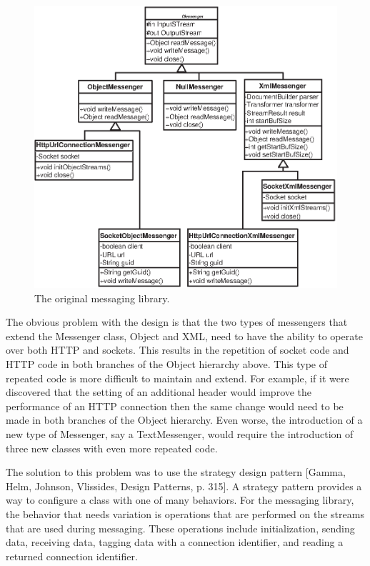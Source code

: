 \documentclass{article}
\begin{document}
\begin{figure}[!hbp]
\includegraphics{old.eps}
\caption{The original messaging library.} \label{old}
\end{figure}

The obvious problem with the design is that the two types of
messengers that extend the Messenger class, Object and XML, need to
have the ability to operate over both HTTP and sockets.  This results
in the repetition of socket code and HTTP code in
both branches of the Object hierarchy above.  This type of repeated
code is more difficult to maintain and extend.  For example, if it were
discovered that the setting of an additional header would improve the
performance of an HTTP connection then the same change would need to be
made in both branches of the Object hierarchy.  Even worse, the
introduction of a new type of Messenger, say a TextMessenger, would
require the introduction of three new classes with even more repeated
code.

The solution to this problem was to use the strategy design pattern
[Gamma, Helm, Johnson, Vlissides, Design Patterns, p. 315].
A strategy pattern provides a way to configure a class with one of
many behaviors.  For the messaging library, the behavior that needs
variation is operations that are performed on the streams that are
used during messaging.  These operations include initialization,
sending data, receiving data, tagging data with a connection
identifier, and reading a returned connection identifier.
\end{document}
